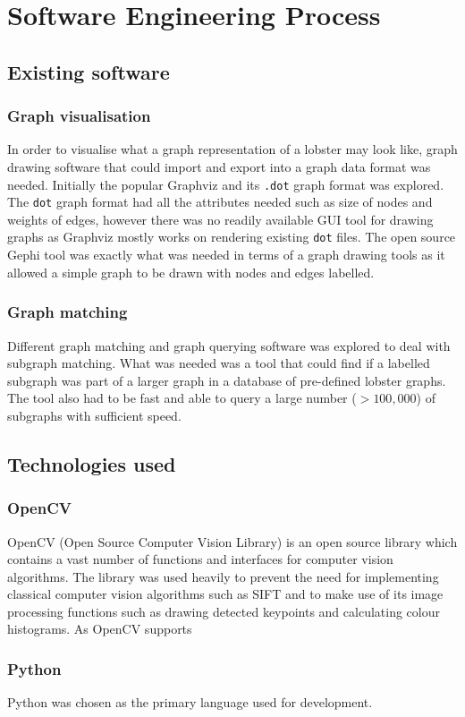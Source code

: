 \section{Software Engineering Process}


\subsection{Existing software}

\subsubsection{Graph visualisation}
In order to visualise what a graph representation of a lobster may look like, graph drawing software that could import and export into a graph data format was needed. Initially the popular Graphviz and its \texttt{.dot} graph format \cite{graphviz-dot} was explored. The \texttt{dot} graph format had all the attributes needed such as size of nodes and weights of edges, however there was no readily available GUI tool for drawing graphs as Graphviz mostly works on rendering existing \texttt{dot} files. 
\n
The open source Gephi \cite{gephi} tool was exactly what was needed in terms of a graph drawing tools as it allowed a simple graph to be drawn with nodes and edges labelled.

\subsubsection{Graph matching}
Different graph matching and graph querying software was explored to deal with subgraph matching. What was needed was a tool that could find if a labelled subgraph was part of a larger graph in a database of pre-defined lobster graphs. The tool also had to be fast and able to query a large number ($> 100,000$) of subgraphs with sufficient speed. 
\cite{graphgrep} \cite{appagato}

\subsection{Technologies used}

\subsubsection{OpenCV}
OpenCV (Open Source Computer Vision Library) \cite{opencv} is an open source library which contains a vast number of functions and interfaces for computer vision algorithms. The library was used heavily to prevent the need for implementing classical computer vision algorithms such as SIFT \cite{sift} and to make use of its image processing functions such as drawing detected keypoints and calculating colour histograms. 
\n
As OpenCV supports 

\subsubsection{Python}
Python was chosen as the primary language used for development.